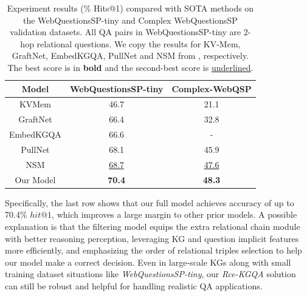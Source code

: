 \documentclass[pdflatex,sn-mathphys]{sn-jnl}%
\theoremstyle{thmstyleone}%
\theoremstyle{thmstyletwo}%
\theoremstyle{thmstylethree}%
\begin{document}
\begin{table}[h]
    \centering
    \begin{tabular}{c|c|c} \hline
    Model & WebQuestionsSP-tiny & Complex-WebQSP\\ \hline %
    KVMem & 46.7 & 21.1 \\ \hline
    GraftNet & 66.4 & 32.8 \\ \hline
    EmbedKGQA & 66.6 & - \\ \hline
    PullNet & 68.1 & 45.9 \\ \hline
    NSM & \underline{68.7} & \underline{47.6} \\ \hline
    Our Model & \bf{70.4} & \bf{48.3} \\ \hline
    \end{tabular}
    \caption{Experiment results (\% Hits@1) compared with SOTA methods on the WebQuestionsSP-tiny and Complex WebQuestionsSP validation datasets. All QA pairs in WebQuestionsSP-tiny are 2-hop relational questions. We copy the results for KV-Mem, GraftNet, EmbedKGQA, PullNet and NSM from \cite{kvmem,sun2018graftnet,apoorv2020embedKGQA,pullnet,he2021stu-teaQA}, respectively. The best score is in \textbf{bold} and the second-best score is \underline{underlined}.}
    \label{comparison_sota_wbq}
\end{table}


Specifically, the last row shows that our full model achieves accuracy of up to 70.4\% $hit@1$, which improves a large margin to other prior models. A possible explanation is that the filtering model equips the extra relational chain module with better reasoning perception, leveraging KG and question implicit features more efficiently, and emphasizing the order of relational triples selection to help our model make a correct decision. Even in large-scale KGs along with small training dataset situations like \textit{WebQuestionsSP-tiny}, our \textit{Rce-KGQA} solution can still be robust and helpful for handling realistic QA applications.
\end{document}
